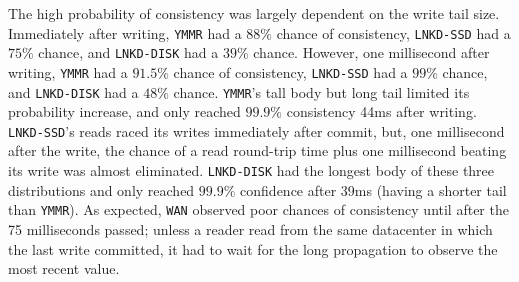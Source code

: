 \documentclass{vldb}
\begin{document}
The high probability of consistency was largely dependent on the write
tail size.  Immediately after writing, \texttt{YMMR} had a $88\%$
chance of consistency, \texttt{LNKD-SSD} had a $75\%$ chance, and
\texttt{LNKD-DISK} had a $39\%$ chance.  However, one millisecond
after writing, \texttt{YMMR} had a $91.5\%$ chance of consistency,
\texttt{LNKD-SSD} had a $99\%$ chance, and \texttt{LNKD-DISK} had a
$48\%$ chance.  \texttt{YMMR}'s tall body but long tail limited its
probability increase, and only reached $99.9\%$ consistency 44ms after
writing.  \texttt{LNKD-SSD}'s reads raced its writes immediately after
commit, but, one millisecond after the write, the chance of a read
round-trip time plus one millisecond beating its write was almost
eliminated.  \texttt{LNKD-DISK} had the longest body of these three
distributions and only reached $99.9\%$ confidence after 39ms (having
a shorter tail than \texttt{YMMR}).  As expected, \texttt{WAN}
observed poor chances of consistency until after the 75 milliseconds
passed; unless a reader read from the same datacenter in which the
last write committed, it had to wait for the long propagation to
observe the most recent value.
\end{document}
